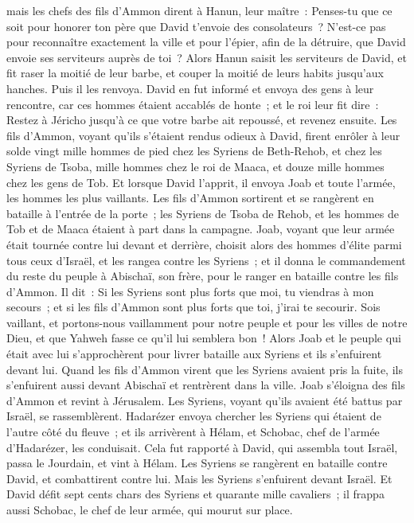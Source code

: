 \begin{multicols}{2}
mais les chefs des fils d'Ammon dirent à Hanun, leur maître~: Penses-tu que ce soit pour honorer ton père que David t'envoie des consolateurs~? N'est-ce pas pour reconnaître exactement la ville et pour l'épier, afin de la détruire, que David envoie ses serviteurs auprès de toi~?
Alors Hanun saisit les serviteurs de David, et fit raser la moitié de leur barbe, et couper la moitié de leurs habits jusqu'aux hanches. Puis il les renvoya.
David en fut informé et envoya des gens à leur rencontre, car ces hommes étaient accablés de honte~; et le roi leur fit dire~: Restez à Jéricho jusqu'à ce que votre barbe ait repoussé, et revenez ensuite.
Les fils d'Ammon, voyant qu'ils s'étaient rendus odieux à David, firent enrôler à leur solde vingt mille hommes de pied chez les Syriens de Beth-Rehob, et chez les Syriens de Tsoba, mille hommes chez le roi de Maaca, et douze mille hommes chez les gens de Tob.
Et lorsque David l'apprit, il envoya Joab et toute l'armée, les hommes les plus vaillants.
Les fils d'Ammon sortirent et se rangèrent en bataille à l'entrée de la porte~; les Syriens de Tsoba de Rehob, et les hommes de Tob et de Maaca étaient à part dans la campagne.
Joab, voyant que leur armée était tournée contre lui devant et derrière, choisit alors des hommes d'élite parmi tous ceux d'Israël, et les rangea contre les Syriens~;
et il donna le commandement du reste du peuple à Abischaï, son frère, pour le ranger en bataille contre les fils d'Ammon.
Il dit~: Si les Syriens sont plus forts que moi, tu viendras à mon secours~; et si les fils d'Ammon sont plus forts que toi, j'irai te secourir.
Sois vaillant, et portons-nous vaillamment pour notre peuple et pour les villes de notre Dieu, et que Yahweh fasse ce qu'il lui semblera bon~!
Alors Joab et le peuple qui était avec lui s'approchèrent pour livrer bataille aux Syriens et ils s'enfuirent devant lui.
Quand les fils d'Ammon virent que les Syriens avaient pris la fuite, ils s'enfuirent aussi devant Abischaï et rentrèrent dans la ville. Joab s'éloigna des fils d'Ammon et revint à Jérusalem.
Les Syriens, voyant qu'ils avaient été battus par Israël, se rassemblèrent.
Hadarézer envoya chercher les Syriens qui étaient de l'autre côté du fleuve~; et ils arrivèrent à Hélam, et Schobac, chef de l'armée d'Hadarézer, les conduisait.
Cela fut rapporté à David, qui assembla tout Israël, passa le Jourdain, et vint à Hélam. Les Syriens se rangèrent en bataille contre David, et combattirent contre lui.
Mais les Syriens s'enfuirent devant Israël. Et David défit sept cents chars des Syriens et quarante mille cavaliers~; il frappa aussi Schobac, le chef de leur armée, qui mourut sur place.

\end{multicols}
